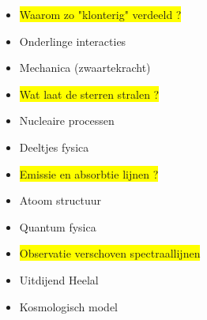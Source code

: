 \newpage

\begin{itemize}
\item \colorbox{yellow}{Waarom zo "klonterig" verdeeld ?}
\item[] Onderlinge interacties
\item[]\begin{center}{\blue Mechanica (zwaartekracht)}\end{center}
\item \colorbox{yellow}{Wat laat de sterren stralen ?}
\item[] Nucleaire processen
\item[]\begin{center}{\blue Deeltjes fysica}\end{center}
\item \colorbox{yellow}{Emissie en absorbtie lijnen ?}
\item[] Atoom structuur
\item[]\begin{center}{\blue Quantum fysica}\end{center}
\item \colorbox{yellow}{Observatie verschoven spectraallijnen}
\item[] Uitdijend Heelal
\item[]\begin{center}{\blue Kosmologisch model}\end{center}
\end{itemize}
